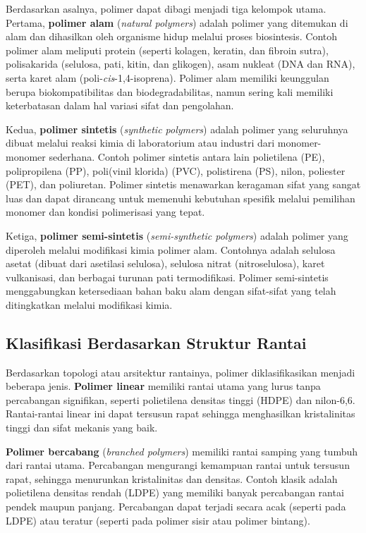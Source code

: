 \documentclass[12pt,a4paper,openany]{book}
\begin{document}
Berdasarkan asalnya, polimer dapat dibagi menjadi tiga kelompok utama. Pertama, \textbf{polimer alam} (\textit{natural polymers}) adalah polimer yang ditemukan di alam dan dihasilkan oleh organisme hidup melalui proses biosintesis. Contoh polimer alam meliputi protein (seperti kolagen, keratin, dan fibroin sutra), polisakarida (selulosa, pati, kitin, dan glikogen), asam nukleat (DNA dan RNA), serta karet alam (poli-\textit{cis}-1,4-isoprena). Polimer alam memiliki keunggulan berupa biokompatibilitas dan biodegradabilitas, namun sering kali memiliki keterbatasan dalam hal variasi sifat dan pengolahan.

Kedua, \textbf{polimer sintetis} (\textit{synthetic polymers}) adalah polimer yang seluruhnya dibuat melalui reaksi kimia di laboratorium atau industri dari monomer-monomer sederhana. Contoh polimer sintetis antara lain polietilena (PE), polipropilena (PP), poli(vinil klorida) (PVC), polistirena (PS), nilon, poliester (PET), dan poliuretan. Polimer sintetis menawarkan keragaman sifat yang sangat luas dan dapat dirancang untuk memenuhi kebutuhan spesifik melalui pemilihan monomer dan kondisi polimerisasi yang tepat.

Ketiga, \textbf{polimer semi-sintetis} (\textit{semi-synthetic polymers}) adalah polimer yang diperoleh melalui modifikasi kimia polimer alam. Contohnya adalah selulosa asetat (dibuat dari asetilasi selulosa), selulosa nitrat (nitroselulosa), karet vulkanisasi, dan berbagai turunan pati termodifikasi. Polimer semi-sintetis menggabungkan ketersediaan bahan baku alam dengan sifat-sifat yang telah ditingkatkan melalui modifikasi kimia.

\subsection{Klasifikasi Berdasarkan Struktur Rantai}

Berdasarkan topologi atau arsitektur rantainya, polimer diklasifikasikan menjadi beberapa jenis. \textbf{Polimer linear} memiliki rantai utama yang lurus tanpa percabangan signifikan, seperti polietilena densitas tinggi (HDPE) dan nilon-6,6. Rantai-rantai linear ini dapat tersusun rapat sehingga menghasilkan kristalinitas tinggi dan sifat mekanis yang baik.

\textbf{Polimer bercabang} (\textit{branched polymers}) memiliki rantai samping yang tumbuh dari rantai utama. Percabangan mengurangi kemampuan rantai untuk tersusun rapat, sehingga menurunkan kristalinitas dan densitas. Contoh klasik adalah polietilena densitas rendah (LDPE) yang memiliki banyak percabangan rantai pendek maupun panjang. Percabangan dapat terjadi secara acak (seperti pada LDPE) atau teratur (seperti pada polimer sisir atau polimer bintang).
\end{document}
